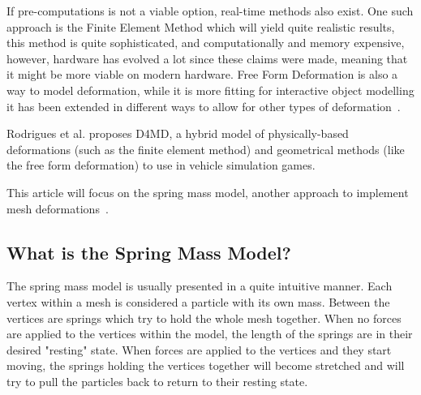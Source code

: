 If pre-computations is not a viable option, real-time methods also exist.
One such approach is the Finite Element Method\cite{muller_fem} which will yield quite realistic results, this method is quite sophisticated, and computationally and memory expensive\cite{rodrigues2005d4md}, however, hardware has evolved a lot since these claims were made, meaning that it might be more viable on modern hardware.
Free Form Deformation is also a way to model deformation, while it is more fitting for interactive object modelling\cite{rodrigues2005d4md} it has been extended in different ways to allow for other types of deformation~\cite{coquillart_eefd}.

Rodrigues et al.\cite{rodrigues2005d4md} proposes D4MD, a hybrid model of physically-based deformations (such as the finite element method) and geometrical methods (like the free form deformation) to use in vehicle simulation games.

This article will focus on the spring mass model, another approach to implement mesh deformations~\cite{provot_mass_spring}. 

\subsection{What is the Spring Mass Model?}
The spring mass model is usually presented in a quite intuitive manner.
Each vertex within a mesh is considered a particle with its own mass.
Between the vertices are springs which try to hold the whole mesh together.
When no forces are applied to the vertices within the model, the length of the springs are in their desired "resting" state.
When forces are applied to the vertices and they start moving, the springs holding the vertices together will become stretched
and will try to pull the particles back to return to their resting state\cite{catlike_mesh_deformation, mosegaards_clothing_simulation, provot_mass_spring}.





